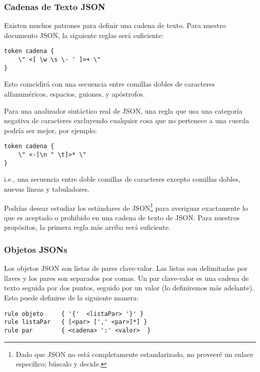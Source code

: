 \subsubsection{Cadenas de Texto JSON}

Existen muchos patrones para definir una cadena de texto. 
Para nuestro documento JSON, la siguiente reglas será suficiente:

\begin{lstlisting}
token cadena {
    \" <[ \w \s \- ' ]>+ \" 
}
\end{lstlisting}

Esto coincidirá con una secuencia entre comillas dobles de
caracteres alfanuméricos, espacios, guiones, y apóstrofos.

Para una analizador sintáctico real de JSON, una regla que usa
una categoría negativa de caracteres excluyendo cualquier cosa que
no pertenece a una cuerda podría ser mejor, por ejemplo:

\begin{lstlisting}
token cadena {
    \" <-[\n " \t]>* \"
}
\end{lstlisting}

i.e., una secuencia entre doble comillas de caracteres excepto 
comillas dobles, nuevas líneas y tabuladores.

Podrías desear estudiar los estándares de JSON\footnote{
Dado que JSON no está completamente estandarizado, no proveeré
un enlace específico; búscalo y decide.} para averiguar 
exactamente lo que es aceptado o prohibido en una cadena de texto
de JSON. Para nuestros propósitos, la primera regla más arriba será
suficiente.

\subsubsection{Objetos JSONs}

Los objetos JSON son listas de pares clave-valor. Las listas
son delimitadas por llaves y los pares son separados por comas.
Un par clave-valor es una cadena de texto seguida por dos puntos,
seguido por un valor (lo definiremos más adelante). Esto puede 
definirse de la siguiente manera:

\begin{lstlisting}
rule objeto     { '{'  <listaPar> '}' }
rule listaPar   { [<par> [',' <par>]*] }
rule par        { <cadena> ':' <valor>  }
\end{lstlisting}

